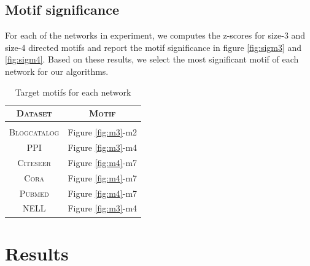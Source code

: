 \documentclass{article}
\theoremstyle{definition}
\begin{document}
\begin{table}
\centering
{}
\caption{Datasets for semi-supervised embeddings}
\label{t:ungraph}
\end{table}


\subsection{Motif significance}

For each of the networks in experiment, we computes the z-scores for
size-3 and size-4 directed motifs and report the motif significance
in figure \ref{fig:sigm3} and \ref{fig:sigm4}. Based on these results, 
we select the most significant motif of each network for our algorithms. 

\begin{table}
\centering
\begin{tabular}{c c}
\textsc{Dataset} & \textsc{Motif} \\
\hline \\
\textsc{Blogcatalog} & Figure \ref{fig:m3}-m2 \\
\textsc{PPI} & Figure \ref{fig:m3}-m4 \\
\textsc{Citeseer} & Figure \ref{fig:m4}-m7 \\
\textsc{Cora} & Figure \ref{fig:m4}-m7 \\
\textsc{Pubmed} & Figure \ref{fig:m4}-m7 \\
\textsc{NELL} & Figure \ref{fig:m3}-m4 \\
\end{tabular}%
\caption{Target motifs for each network}
\label{t:motifs}
\end{table}

\section{Results}
\end{document}
